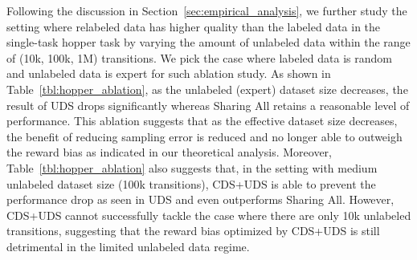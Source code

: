 \begin{table}[t!]
\centering
\scriptsize
{}
\caption{\footnotesize Ablation study on the unlabeled dataset size ranging from 10k to 1M transitions in the single-task hopper domain. We bold the best method without true reward relabeling.}
\label{tbl:hopper_ablation}
\normalsize
\end{table}

Following the discussion in Section~\ref{sec:empirical_analysis}, we further study the setting where relabeled data has higher quality than the labeled data in the single-task hopper task by varying the amount of unlabeled data within the range of (10k, 100k, 1M) transitions. We pick the case where labeled data is random and unlabeled data is expert for such ablation study. As shown in Table~\ref{tbl:hopper_ablation}, as the unlabeled (expert) dataset size decreases, the result of UDS drops significantly whereas Sharing All retains a reasonable level of performance. This ablation suggests that as the effective dataset size decreases, the benefit of reducing sampling error is reduced and no longer able to outweigh the reward bias as indicated in our theoretical analysis. Moreover, Table~\ref{tbl:hopper_ablation} also suggests that, in the setting with medium unlabeled dataset size (100k transitions), CDS+UDS is able to prevent the performance drop as seen in UDS and even outperforms Sharing All. However, CDS+UDS cannot successfully tackle the case where there are only 10k unlabeled transitions, suggesting that the reward bias optimized by CDS+UDS is still detrimental in the limited unlabeled data regime.

\subsection{}
\label{app:reward_learning_ablation}

